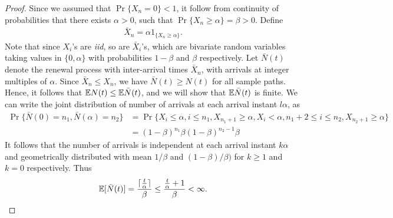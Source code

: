 \documentclass[a4paper,10pt, english]{article}
\begin{document}
\begin{proof}
Since we assumed that $\Pr\{X_n = 0\} < 1$, it follow from continuity of probabilities that there exists $\alpha > 0$, such that $\Pr\{X_n \geq \alpha\} = \beta >0$. Define
\begin{align*}
\bar{X}_n = \alpha 1_{\{X_n \geq \alpha\}}.
\end{align*}
Note that since $X_i$'s are \textit{iid}, so are $\bar{X}_i$'s, which are bivariate random variables taking values in $\{0, \alpha\}$ with probabilities $1-\beta$ and $\beta$ respectively. %
Let $\bar{N}(t)$ denote the renewal process with inter-arrival times $\bar{X}_n$, with arrivals at integer multiples of $\alpha$. 
Since $\bar{X}_n \leq X_n$, we have $\bar{N}(t) \geq N(t)$ for all sample paths. 
Hence, it follows that $\mathbb{E} N(t) \leq \mathbb{E} \bar{N}(t)$, and we will show that $\mathbb{E}\bar{N}(t)$ is finite. 
We can write the joint distribution of number of arrivals at each arrival instant $l\alpha$, as 
\begin{align*}
\Pr\{\bar{N}(0)=n_1, \bar{N}(\alpha) = n_2\} &= \Pr\{X_i \leq \alpha, i \leq n_1, X_{n_1+1} \geq \alpha, X_i < \alpha, n_1 +2 \leq i \leq n_2, X_{n_2+1} \geq \alpha \}\\
&=  (1-\beta)^{n_1}\beta(1-\beta)^{n_2-1}\beta
\end{align*}
It follows that the number of arrivals is independent at each arrival instant $k\alpha$ and geometrically distributed with mean $1/\beta$ and $(1-\beta)/\beta)$ for $k \geq 1$ and $k = 0$ respectively.  
Thus 
\begin{align*}
\mathbb{E}[\bar{N}(t)] = \frac{\lceil\frac{t}{\alpha} \rceil}{\beta} \leq \frac{\frac{t}{\alpha} + 1}{\beta} < \infty.
\end{align*}
\end{proof} 
\end{document}
